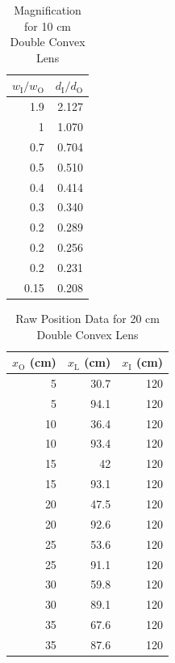 \begin{table}[ht]
    \centering
    \begin{tabular}{r|r}
        $w_{\text{I}} / w_{\text{O}}$ & $d_{\text{I}} / d_{\text{O}}$ \\
        \hline
        1.9 & 2.127 \\
        1 & 1.070 \\
        0.7 & 0.704 \\
        0.5 & 0.510 \\
        0.4 & 0.414 \\
        0.3 & 0.340 \\
        0.2 & 0.289 \\
        0.2 & 0.256 \\
        0.2 & 0.231 \\
        0.15 & 0.208 \\
        \hline
    \end{tabular}
    \caption{Magnification for 10 cm Double Convex Lens}
    \label{table.08.magnification.10cm}
\end{table}
%
\begin{table}[ht!]
    \centering
    \begin{tabular}{r|r|r}
        $x_{\text{O}}$ (cm) & $x_{\text{L}}$ (cm) & $x_{\text{I}}$ (cm) \\
        \hline
        5 & 30.7 & 120 \\
        5 & 94.1 & 120 \\
        10 & 36.4 & 120 \\
        10 & 93.4 & 120 \\
        15 & 42 & 120 \\
        15 & 93.1 & 120 \\
        20 & 47.5 & 120 \\
        20 & 92.6 & 120 \\
        25 & 53.6 & 120 \\
        25 & 91.1 & 120 \\
        30 & 59.8 & 120 \\
        30 & 89.1 & 120 \\
        35 & 67.6 & 120 \\
        35 & 87.6 & 120 \\
        \hline
        \end{tabular}
    \caption{Raw Position Data for 20 cm Double Convex Lens}
    \label{table.08.position.20cm}
\end{table}
%
